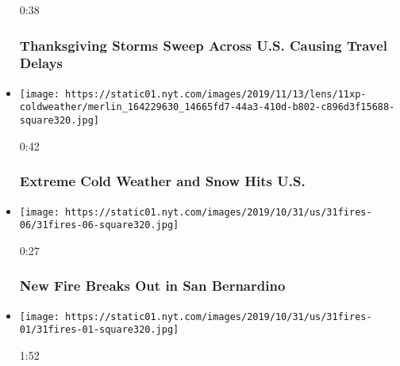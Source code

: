 \begin{itemize}
  0:38

  \hypertarget{thanksgiving-storms-sweep-across-us-causing-travel-delays}{%
  \subsubsection{Thanksgiving Storms Sweep Across U.S. Causing Travel
  Delays}\label{thanksgiving-storms-sweep-across-us-causing-travel-delays}}
\item
  \href{https://www.nytimes.com/video/us/100000006820395/cold-front-snow.html?action=click\&module=video-series-bar\&region=header\&pgtype=Article\&playlistId=video/extreme-weather}{}

  \texttt{[image: https://static01.nyt.com/images/2019/11/13/lens/11xp-coldweather/merlin\_164229630\_14665fd7-44a3-410d-b802-c896d3f15688-square320.jpg]}

  0:42

  \hypertarget{extreme-cold-weather-and-snow-hits-us}{%
  \subsubsection{Extreme Cold Weather and Snow Hits
  U.S.}\label{extreme-cold-weather-and-snow-hits-us}}
\item
  \href{https://www.nytimes.com/video/us/100000006800502/fire-san-bernardino.html?action=click\&module=video-series-bar\&region=header\&pgtype=Article\&playlistId=video/extreme-weather}{}

  \texttt{[image: https://static01.nyt.com/images/2019/10/31/us/31fires-06/31fires-06-square320.jpg]}

  0:27

  \hypertarget{new-fire-breaks-out-in-san-bernardino}{%
  \subsubsection{New Fire Breaks Out in San
  Bernardino}\label{new-fire-breaks-out-in-san-bernardino}}
\item
  \href{https://www.nytimes.com/video/us/100000006797674/california-fires-simi-valley.html?action=click\&module=video-series-bar\&region=header\&pgtype=Article\&playlistId=video/extreme-weather}{}

  \texttt{[image: https://static01.nyt.com/images/2019/10/31/us/31fires-01/31fires-01-square320.jpg]}

  1:52

  \hypertarget{southern-california-fire-danger-intensifies-with-powerful-winds}{%
}
\end{itemize}
